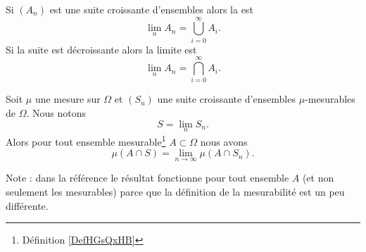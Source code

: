 \begin{definition}
    Si \( (A_n)\) est une suite croissante d'ensembles alors la  est
    \begin{equation}
        \lim_nA_n=\bigcup_{i=0}^{\infty}A_i.
    \end{equation}
    Si la suite est décroissante alors la limite est
    \begin{equation}
        \lim_nA_n=\bigcap_{i=0}^{\infty}A_i.
    \end{equation}
\end{definition}

\begin{proposition} \label{PropAFNPSsm}
    Soit \( \mu\) une mesure sur \( \Omega\) et \( (S_n)\) une suite croissante d'ensembles \( \mu\)-mesurables de \( \Omega\). Nous notons
    \begin{equation}
        S=\lim_nS_n.
    \end{equation}
    Alors pour tout ensemble mesurable\footnote{Définition \ref{DefHGsQxHB}} \( A\subset\Omega\) nous avons
    \begin{equation}
        \mu(A\cap S)=\lim_{n\to \infty} \mu(A\cap S_n).
    \end{equation}
\end{proposition}
Note : dans la référence le résultat fonctionne pour tout ensemble \( A\) (et non seulement les mesurables) parce que la définition de la mesurabilité est un peu différente.

